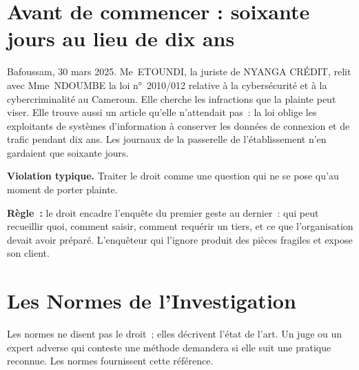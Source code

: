 \bigskip

\section*{Avant de commencer : soixante jours au lieu de dix ans}

Bafoussam, 30 mars 2025. Me~ETOUNDI, la juriste de NYANGA CRÉDIT, relit avec
Mme~NDOUMBE la loi n°~2010/012 relative à la cybersécurité et à la
cybercriminalité au Cameroun. Elle cherche les infractions que la plainte
peut viser. Elle trouve aussi un article qu'elle n'attendait pas~: la loi
oblige les exploitants de systèmes d'information à conserver les données de
connexion et de trafic pendant dix ans. Les journaux de la passerelle de
l'établissement n'en gardaient que soixante jours.

\begin{boxalert}
\textbf{Violation typique.} Traiter le droit comme une question qui ne se
pose qu'au moment de porter plainte.

\smallskip
\textbf{Règle~:} le droit encadre l'enquête du premier geste au dernier~:
qui peut recueillir quoi, comment saisir, comment requérir un tiers, et ce
que l'organisation devait avoir préparé. L'enquêteur qui l'ignore produit
des pièces fragiles et expose son client.
\end{boxalert}

\separateur

\section{Les Normes de l'Investigation}
\label{sec:c08-normes}

Les normes ne disent pas le droit~; elles décrivent l'état de l'art. Un juge
ou un expert adverse qui conteste une méthode demandera si elle suit une
pratique reconnue. Les normes fournissent cette référence.

